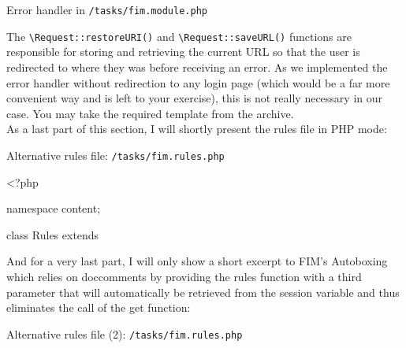 \documentclass{scrartcl}
\begin{document}
      \begin{listing}[H]
         \caption{Error handler in \texttt{/tasks/fim.module.php}}
      \end{listing}
      The \lstinline!\Request::restoreURI()! and \lstinline!\Request::saveURL()! functions are responsible for storing and retrieving the current URL so that the user is redirected to where they was before receiving an error. As we implemented the error handler without redirection to any login page (which would be a far more convenient way and is left to your exercise), this is not really necessary in our case. You may take the required template from the archive. \\
      As a last part of this section, I will shortly present the rules file in PHP mode:
      \begin{listing}[H]
         \caption{Alternative rules file: \texttt{/tasks/fim.rules.php}}
         \begin{phpcode}
<?php

namespace content\tasks;

class Rules extends 
         \end{phpcode}
      \end{listing}
      And for a very last part, I will only show a short excerpt to FIM's Autoboxing which relies on doccomments by providing the rules function with a third parameter that will automatically be retrieved from the session variable and thus eliminates the call of the get function:
      \begin{listing}[H]
         \caption{Alternative rules file (2): \texttt{/tasks/fim.rules.php}}
         \begin{phpcode*}{frame=topline}
<?php

namespace content\tasks;

class Rules extends \Rules {
         \end{phpcode*}
      \end{listing}
\end{document}
